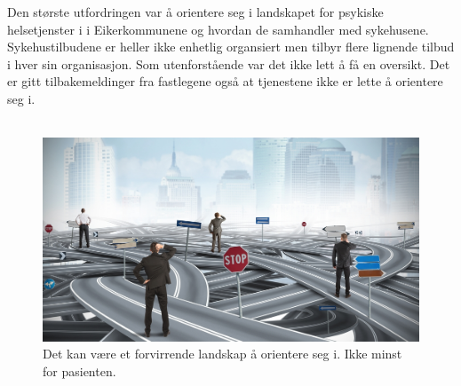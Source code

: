 \documentclass[11pt]{report} %
\begin{document}
                    Den største utfordringen var å orientere seg i landskapet for psykiske helsetjenster i i Eikerkommunene og hvordan de samhandler med sykehusene. Sykehustilbudene er heller ikke enhetlig organsiert men tilbyr flere lignende tilbud i hver sin organisasjon. Som utenforstående var det ikke lett å få en oversikt. Det er gitt tilbakemeldinger fra fastlegene også at tjenestene ikke er lette å orientere seg i. \\ 
                    \\

                    \begin{figure}[ht]
                      \begin{mdframed}[style=mystyle]
                      \centering
                      \includegraphics{./pix/kaotiskvei.jpg}%
                      \caption[Framstilling av tjenestetilbudene]%
                      {Det kan være et forvirrende landskap å orientere seg i. Ikke minst for pasienten.\cite{shutter}}
                    \end{mdframed}
                    \end{figure}    
\end{document}
